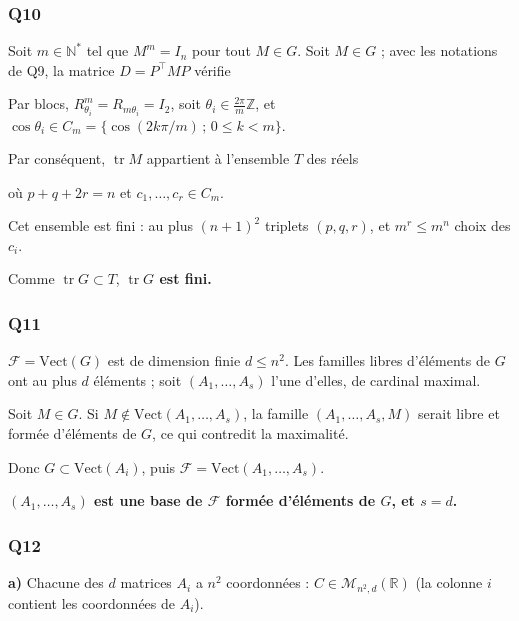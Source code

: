 \documentclass[11pt,a4paper]{article}
\newcommand{\equationajustee}[1]{%
  \sbox{\boiteequation}{$\displaystyle #1$}%
  \ifdim\wd\boiteequation>\linewidth
    \[\resizebox{\linewidth}{!}{\usebox{\boiteequation}}\]%
  \else
    \[#1\]%
  \fi}
\begin{document}
\hypertarget{q10}{%
\subsubsection{Q10}\label{q10}}

Soit \(m\in{\mathbb{N}}^*\) tel que \(M^m=I_n\) pour tout \(M\in G\). Soit \(M\in G\) ; avec les notations de Q9, la matrice \(D=P^\top MP\) vérifie

\equationajustee{D^m=P^\top M^mP=I_n.}

Par blocs, \(R_{\theta_i}^m=R_{m\theta_i}=I_2\), soit \(\theta_i\in\frac{2\pi}{m}\mathbb{Z}\), et \(\cos\theta_i\in C_m=\{\cos(2k\pi/m)\,;\,0\leqslant k<m\}\).

Par conséquent, \(\operatorname{tr}M\) appartient à l'ensemble \(T\) des réels

\equationajustee{p-q+2\sum_{i=1}^rc_i,}

où \(p+q+2r=n\) et \(c_1,\dots,c_r\in C_m\).

Cet ensemble est fini : au plus \((n+1)^2\) triplets \((p,q,r)\), et \(m^r\leqslant m^n\) choix des \(c_i\).

Comme \(\operatorname{tr}G\subset T\), \textbf{\(\operatorname{tr}G\) est fini.}

\hypertarget{q11}{%
\subsubsection{Q11}\label{q11}}

\(\mathcal{F}=\mathrm{Vect}(G)\) est de dimension finie \(d\leqslant n^2\). Les familles libres d'éléments de \(G\) ont au plus \(d\) éléments ; soit \((A_1,\dots,A_s)\) l'une d'elles, de cardinal maximal.

Soit \(M\in G\). Si \(M\notin\mathrm{Vect}(A_1,\dots,A_s)\), la famille \((A_1,\dots,A_s,M)\) serait libre et formée d'éléments de \(G\), ce qui contredit la maximalité.

Donc \(G\subset\mathrm{Vect}(A_i)\), puis \(\mathcal{F}=\mathrm{Vect}(A_1,\dots,A_s)\).

\textbf{\((A_1,\dots,A_s)\) est une base de \(\mathcal{F}\) formée d'éléments de \(G\), et \(s=d\).}

\hypertarget{q12}{%
\subsubsection{Q12}\label{q12}}

\textbf{a)} Chacune des \(d\) matrices \(A_i\) a \(n^2\) coordonnées : \(\boxed{C\in{\mathcal{M}}_{n^2,d}(\mathbb{R})}\) (la colonne \(i\) contient les coordonnées de \(A_i\)).
\end{document}
